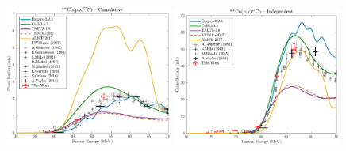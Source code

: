 \begin{figure}
 \includegraphics[width=0.49\textwidth]{./figures/57Ni.pdf}
 \includegraphics[width=0.49\textwidth]{./figures/57Co_ind.pdf}

\vspace{-20pt} 
\end{figure}

